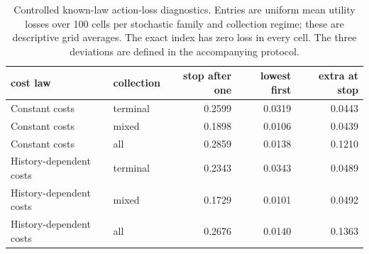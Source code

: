 \begin{table}[htb]\centering\footnotesize
\caption{Controlled known-law action-loss diagnostics. Entries are uniform mean utility losses over 100 cells per stochastic family and collection regime; these are descriptive grid averages. The exact index has zero loss in every cell. The three deviations are defined in the accompanying protocol.}\label{tab:staging-loss}
\begin{tabular}{llrrr}\toprule
cost law & collection & stop after one & lowest first & extra at stop \\ \midrule
Constant costs & terminal & 0.2599 & 0.0319 & 0.0443 \\
Constant costs & mixed & 0.1898 & 0.0106 & 0.0439 \\
Constant costs & all & 0.2859 & 0.0138 & 0.1210 \\
History-dependent costs & terminal & 0.2343 & 0.0343 & 0.0489 \\
History-dependent costs & mixed & 0.1729 & 0.0101 & 0.0492 \\
History-dependent costs & all & 0.2676 & 0.0140 & 0.1363 \\
\bottomrule\end{tabular}\end{table}
